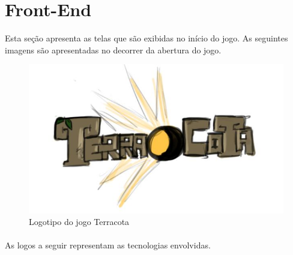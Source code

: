 \documentclass[12pt]{article}
\begin{document}
\newpage
\section{Front-End}
Esta seção apresenta as telas que são exibidas no início do jogo. As seguintes
imagens são apresentadas no decorrer da abertura do jogo.

\begin{figure}[!htb]
    \centering
    \includegraphics[scale=0.5]{logo-terracota.jpg}
    \caption{Logotipo do jogo Terracota}
    \label{fig:terracota_logo}
\end{figure}

\paragraph{} As logos a seguir representam as tecnologias envolvidas.
\end{document}
